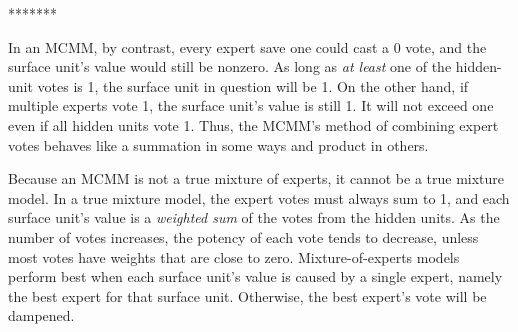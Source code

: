 *******

In an MCMM, by contrast, every expert save one could cast a 0 vote, and the surface 
unit's value would still be nonzero. As long as \emph{at least} one of the hidden-unit 
votes is 1, the surface unit in question will be 1. On the other hand, if multiple experts 
vote 1, the surface unit's value is still 1. It will not exceed one even if all hidden units 
vote 1. Thus, the \ac{MCMM}'s method of combining expert votes behaves like a 
summation in some ways and product in others.  

Because an \ac{MCMM} is not a true mixture of experts, it cannot be a true mixture model. 
In a true mixture model, the expert votes must always sum to 1, and each surface unit's value 
is a \emph{weighted sum} of the votes from the hidden units. As the number of votes increases, 
the potency of each vote tends to decrease, unless most votes have weights that are close to zero. 
Mixture-of-experts models perform best when each surface unit's value is caused by a single 
expert, namely the best expert for that surface unit. Otherwise, the best expert's vote will be 
dampened. 

